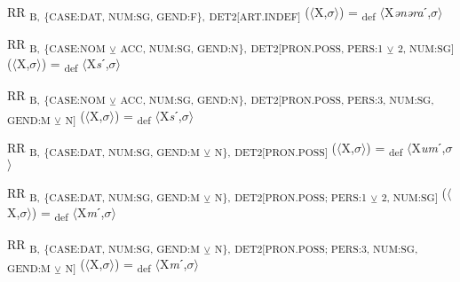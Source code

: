 {\begin{exe}
 RR \textsubscript{B,} \textsubscript{\{CASE:DAT, NUM:SG, GEND:F\},} \textsubscript{DET2[ART.INDEF]} ($\langle$X,$\sigma $$\rangle$) = \textsubscript{def} $\langle$X\textit{ənəra}ˊ,$\sigma $$\rangle$
\end{exe}

\begin{exe}
 RR \textsubscript{B,} \textsubscript{\{CASE:NOM} \textsubscript{${\veebar}$}\textsubscript{ ACC, NUM:SG, GEND:N\},} \textsubscript{DET2[PRON.POSS, PERS:1} \textsubscript{${\veebar}$}\textsubscript{ 2, NUM:SG]} ($\langle$X,$\sigma $$\rangle$) = \textsubscript{def} $\langle$X\textit{s}ˊ,$\sigma $$\rangle$
\end{exe}

\begin{exe}
 RR \textsubscript{B,} \textsubscript{\{CASE:NOM} \textsubscript{${\veebar}$}\textsubscript{ ACC, NUM:SG, GEND:N\},} \textsubscript{DET2[PRON.POSS, PERS:3, NUM:SG, GEND:M} \textsubscript{${\veebar}$}\textsubscript{ N]} ($\langle$X,$\sigma $$\rangle$) = \textsubscript{def} $\langle$X\textit{s}ˊ,$\sigma $$\rangle$
\end{exe}

\begin{exe}
 RR \textsubscript{B,} \textsubscript{\{CASE:DAT, NUM:SG, GEND:M} \textsubscript{${\veebar}$}\textsubscript{ N\},} \textsubscript{DET2[PRON.POSS]} ($\langle$X,$\sigma $$\rangle$) = \textsubscript{def} $\langle$X\textit{um}ˊ,$\sigma $$\rangle$
\end{exe}

\begin{exe}
 RR \textsubscript{B,} \textsubscript{\{CASE:DAT, NUM:SG, GEND:M} \textsubscript{${\veebar}$}\textsubscript{ N\},} \textsubscript{DET2[PRON.POSS; PERS:1} \textsubscript{${\veebar}$}\textsubscript{ 2, NUM:SG]} ($\langle$X,$\sigma $$\rangle$) = \textsubscript{def} $\langle$X\textit{m}ˊ,$\sigma $$\rangle$
\end{exe}

\begin{exe}
 RR \textsubscript{B,} \textsubscript{\{CASE:DAT, NUM:SG, GEND:M} \textsubscript{${\veebar}$}\textsubscript{ N\},} \textsubscript{DET2[PRON.POSS; PERS:3, NUM:SG, GEND:M} \textsubscript{${\veebar}$}\textsubscript{ N]} ($\langle$X,$\sigma $$\rangle$) = \textsubscript{def} $\langle$X\textit{m}ˊ,$\sigma $$\rangle$
\end{exe}

}
